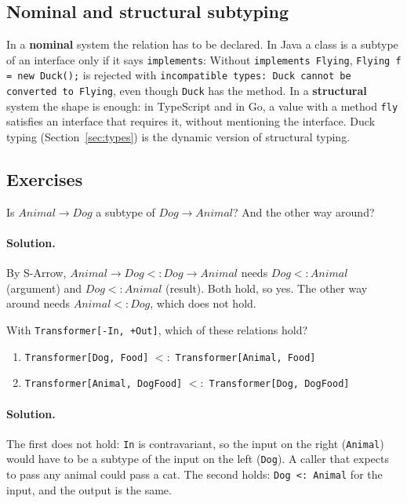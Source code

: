 \subsection{Nominal and structural subtyping}

In a \textbf{nominal} system the relation has to be declared. In Java a class
is a subtype of an interface only if it says \texttt{implements}:
Without \texttt{implements Flying}, \texttt{Flying f = new Duck();} is rejected
with \texttt{incompatible types: Duck cannot be converted to Flying}, even
though \texttt{Duck} has the method. In a \textbf{structural} system the shape is
enough: in TypeScript and in Go, a value with a method \texttt{fly} satisfies an
interface that requires it, without mentioning the interface. Duck typing
(Section~\ref{sec:types}) is the dynamic version of structural typing.

\subsection{Exercises}

\begin{exercise}
Is $\mathit{Animal} \to \mathit{Dog}$ a subtype of $\mathit{Dog} \to \mathit{Animal}$? And the
other way around?
\end{exercise}

\paragraph{Solution.} By S-Arrow, $\mathit{Animal} \to \mathit{Dog} <: \mathit{Dog} \to \mathit{Animal}$
needs $\mathit{Dog} <: \mathit{Animal}$ (argument) and $\mathit{Dog} <: \mathit{Animal}$ (result).
Both hold, so yes. The other way around needs $\mathit{Animal} <: \mathit{Dog}$, which
does not hold.

\begin{exercise}
With \texttt{Transformer[-In, +Out]}, which of these relations hold?
\begin{enumerate}
  \item \texttt{Transformer[Dog, Food]} $<:$ \texttt{Transformer[Animal, Food]}
  \item \texttt{Transformer[Animal, DogFood]} $<:$ \texttt{Transformer[Dog, DogFood]}
\end{enumerate}
\end{exercise}

\paragraph{Solution.} The first does not hold: \texttt{In} is contravariant, so
the input on the right (\texttt{Animal}) would have to be a subtype of the
input on the left (\texttt{Dog}). A caller that expects to pass any animal
could pass a cat. The second holds: \texttt{Dog <: Animal} for the input, and
the output is the same.
